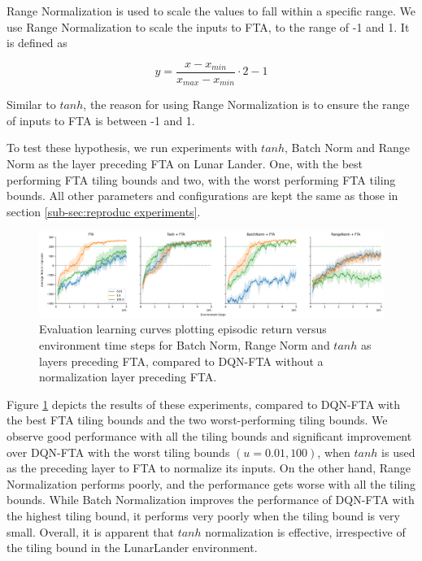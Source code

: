 \documentclass{article}
\begin{document}
Range Normalization is used to scale the values to fall within a specific range.
We use Range Normalization to scale the inputs to FTA, to the range of -1 and 1. It is defined as

 \begin{equation}
    y = \frac{x - x_{min}}{x_{max} - x_{min}} \cdot 2 - 1
    \label{eq:rangnorm}
 \end{equation}

 Similar to $tanh$, the reason for using Range Normalization is to ensure the range of inputs to FTA is between -1 and 1.

To test these hypothesis, we run experiments with $tanh$, Batch Norm and Range Norm as the layer preceding FTA on Lunar Lander.
One, with the best performing FTA tiling bounds and two, with the worst performing FTA tiling bounds.
All other parameters and configurations are kept the same as those in section \ref{sub-sec:reproduc experiments}.

\begin{figure}[h]
    \centering
    \includegraphics[width=12cm]{normalizing.png}
    \caption{Evaluation learning curves plotting episodic return versus environment time steps for Batch Norm, Range Norm and $tanh$ as layers preceding FTA, compared to DQN-FTA without a normalization layer preceding FTA.}
    \label{fig:bnvtanh}
\end{figure}

Figure \ref{fig:bnvtanh} depicts the results of these experiments, compared to DQN-FTA with the best FTA tiling bounds and the two worst-performing tiling bounds. We observe good performance with all the tiling bounds and significant improvement over DQN-FTA with the worst tiling bounds $(u = 0.01, 100)$, when $tanh$ is used as the preceding layer to FTA to normalize its inputs. On the other hand, Range Normalization performs poorly, and the performance gets worse with all the tiling bounds. While Batch Normalization improves the performance of DQN-FTA with the highest tiling bound, it performs very poorly when the tiling bound is very small. Overall, it is apparent that $tanh$ normalization is effective, irrespective of the tiling bound in the LunarLander environment.
\end{document}
